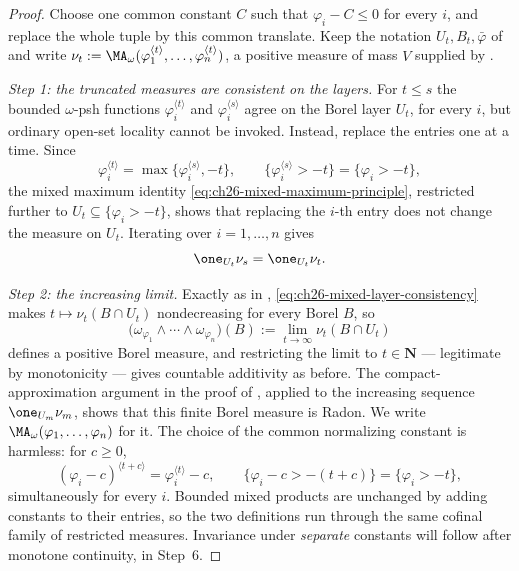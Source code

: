\begin{proof}
Choose one common constant $C$ such that $\varphi_i-C\leq0$ for every
$i$, and replace the whole tuple by this common translate.  Keep the
notation $U_t,B_t,\bar\varphi$ of
 and write
$\nu_t:=\MA_\omega(\varphi_1^{\langle t\rangle},\ldots,
\varphi_n^{\langle t\rangle})$, a positive measure of mass $V$ supplied by
.

\emph{Step 1: the truncated measures are consistent on the layers.}  For
$t\leq s$ the bounded $\omega$-psh functions
$\varphi_i^{\langle t\rangle}$ and
$\varphi_i^{\langle s\rangle}$ agree on the Borel layer $U_t$, for
every $i$, but ordinary open-set locality cannot be invoked.  Instead,
replace the entries one at a time.  Since
\[
 \varphi_i^{\langle t\rangle}
 =\max\{\varphi_i^{\langle s\rangle},-t\},
 \qquad
 \{\varphi_i^{\langle s\rangle}>-t\}=\{\varphi_i>-t\},
\]
the mixed maximum identity
\eqref{eq:ch26-mixed-maximum-principle}, restricted further to
$U_t\subseteq\{\varphi_i>-t\}$, shows that replacing the $i$-th entry
does not change the measure on $U_t$.  Iterating over $i=1,\ldots,n$
gives
\begin{equation}
\label{eq:ch26-mixed-layer-consistency}
 \one_{U_t}\nu_s=\one_{U_t}\nu_t .
\end{equation}

\emph{Step 2: the increasing limit.}  Exactly as in
, \eqref{eq:ch26-mixed-layer-consistency} makes
$t\mapsto\nu_t(B\cap U_t)$ nondecreasing for every Borel $B$, so
\begin{equation}
\label{eq:ch26-mixed-definition}
 \bigl(\omega_{\varphi_1}\wedge\cdots\wedge\omega_{\varphi_n}\bigr)(B)
 :=\lim_{t\to\infty}\nu_t(B\cap U_t)
\end{equation}
defines a positive Borel measure, and restricting the limit to
$t\in\mathbf N$ --- legitimate by monotonicity --- gives countable
additivity as before.  The compact-approximation argument in the proof of
, applied to the increasing sequence
$\one_{U_m}\nu_m$, shows that this finite Borel measure is Radon.  We write
$\MA_\omega(\varphi_1,\ldots,\varphi_n)$ for it.  The choice of the common
normalizing constant is harmless: for $c\geq0$,
\[
 (\varphi_i-c)^{\langle t+c\rangle}
   =\varphi_i^{\langle t\rangle}-c,
 \qquad
 \{\varphi_i-c>-(t+c)\}=\{\varphi_i>-t\},
\]
simultaneously for every $i$.  Bounded mixed products are unchanged by
adding constants to their entries, so the two definitions run through the
same cofinal family of restricted measures.  Invariance under
\emph{separate} constants will follow after monotone continuity, in Step~6.


\end{proof}
